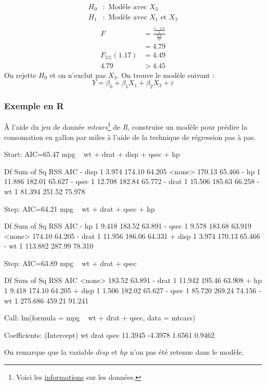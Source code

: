 \documentclass[11pt,french]{report}
\begin{document}
\begin{align*}
H_0 &: \text{ Modèle avec $X_3$} \\
H_1 &: \text{ Modèle avec $X_1$ et $X_3$} \\
\end{align*}
\begin{align*}
F &= \frac{\frac{5 - 3.9}{1}}{\frac{3.9}{17}} \\
&= 4.79 \\
F_{5 \%}(1.17) &= 4.49 \\
4.79 &> 4.45
\end{align*}
On rejette $H_0$ et on n'exclut pas $X_3$. \newline
On trouve le modèle suivant :
$$
Y = \beta_0 + \beta_1X_1 + \beta_2X_3 + \varepsilon
$$

\subsubsection*{Exemple en R}
À l'aide du jeu de donnée \emph{mtcars}\footnote{Voici les \href{https://stat.ethz.ch/R-manual/R-devel/library/datasets/html/mtcars.html}{informations} sur les données.} de \emph{R}, construise un modèle pour prédire la consomation en gallon par miles à l'aide de la technique de régression pas à pas. 
\begin{Schunk}
\begin{Soutput}
Start:  AIC=65.47
mpg ~ wt + drat + disp + qsec + hp

       Df Sum of Sq    RSS    AIC
- disp  1     3.974 174.10 64.205
<none>              170.13 65.466
- hp    1    11.886 182.01 65.627
- qsec  1    12.708 182.84 65.772
- drat  1    15.506 185.63 66.258
- wt    1    81.394 251.52 75.978

Step:  AIC=64.21
mpg ~ wt + drat + qsec + hp

       Df Sum of Sq    RSS    AIC
- hp    1     9.418 183.52 63.891
- qsec  1     9.578 183.68 63.919
<none>              174.10 64.205
- drat  1    11.956 186.06 64.331
+ disp  1     3.974 170.13 65.466
- wt    1   113.882 287.99 78.310

Step:  AIC=63.89
mpg ~ wt + drat + qsec

       Df Sum of Sq    RSS    AIC
<none>              183.52 63.891
- drat  1    11.942 195.46 63.908
+ hp    1     9.418 174.10 64.205
+ disp  1     1.506 182.02 65.627
- qsec  1    85.720 269.24 74.156
- wt    1   275.686 459.21 91.241

Call:
lm(formula = mpg ~ wt + drat + qsec, data = mtcars)

Coefficients:
(Intercept)           wt         drat         qsec  
    11.3945      -4.3978       1.6561       0.9462  
\end{Soutput}
\end{Schunk}
On remarque que la variable $disp$ et $hp$ n'on pas été retenue dans le modèle.
\end{document}
